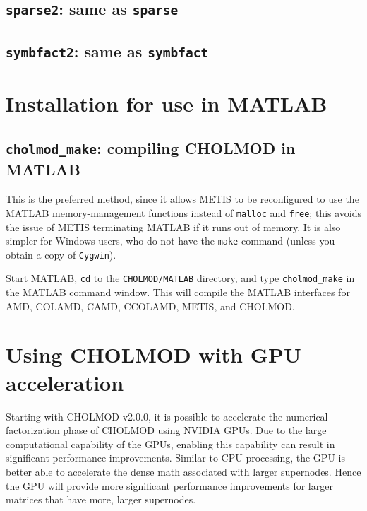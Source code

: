\documentclass[11pt]{article}
\begin{document}
\subsection{{\tt sparse2}: same as {\tt sparse}}				
\newpage
\subsection{{\tt symbfact2}: same as {\tt symbfact}}				

\newpage \section{Installation for use in MATLAB}

\subsection{{\tt cholmod\_make}: compiling CHOLMOD in MATLAB}

This is the preferred method, since it allows METIS to be reconfigured to
use the MATLAB memory-management functions instead of {\tt malloc} and {\tt free};
this avoids the issue of METIS terminating MATLAB if it runs out of memory.
It is also simpler for Windows users, who do not have the {\tt make}
command (unless you obtain a copy of {\tt Cygwin}).

Start MATLAB, {\tt cd} to the {\tt CHOLMOD/MATLAB} directory, and
type {\tt cholmod\_make} in the MATLAB command window.  This will compile
the MATLAB interfaces for AMD, COLAMD, CAMD, CCOLAMD, METIS, and CHOLMOD.

\newpage \section{Using CHOLMOD with GPU acceleration}

Starting with CHOLMOD v2.0.0, it is possible to accelerate the numerical
factorization phase of CHOLMOD using NVIDIA GPUs.  Due to the large
computational capability of the GPUs, enabling this capability can result in
significant performance improvements.  Similar to CPU processing, the GPU is
better able to accelerate the dense math associated with larger supernodes.
Hence the GPU will provide more significant performance improvements for larger
matrices that have more, larger supernodes.
\end{document}
